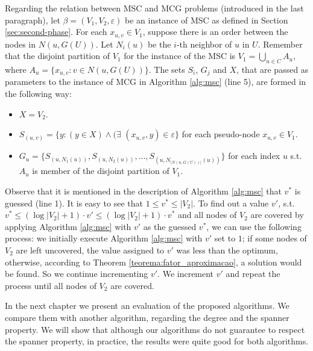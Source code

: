 Regarding the relation between MSC and MCG problems (introduced in the last paragraph), let $\beta=(V_1, V_2, \varepsilon)$ be an instance of MSC as defined in Section \ref{sec:second-phase}. For each $x_{u,v} \in V_1$, 
suppose there is an order between the nodes in $N(u,G(U))$. Let $N_i(u)$ be the $i$-th neighbor of $u$ in $U$. Remember that the disjoint partition 
of $V_1$ for the instance of the MSC is $V_1 = \bigcup_{u \in C}A_u$, where $A_u = \lbrace x_{u,v} :  v \in N(u, G(U)) \rbrace$. 
The sets $S_i$, $G_j$ and $X$, that are passed as parameters to the instance of MCG in Algorithm \ref{alg:msc} (line 5), are formed in the following way:

    \begin{itemize}
      \item $X = V_2$.
      \item $S_{(u, v)}=\{y : (y \in X) \land (\exists$ $(x_{u, v}, y) \in \varepsilon\}$ for each pseudo-node $x_{u, v} \in V_1$.
      \item $G_u = \lbrace S_{(u,N_1(u))}, S_{(u,N_2(u))}, ..., S_{(u,N_{|N(u,G(U))|}(u))} \rbrace$ for each index $u$ s.t. $A_u$ is member of the disjoint partition of $V_1$.
    \end{itemize}

Observe that it is mentioned in the description of Algorithm \ref{alg:msc} that $v^*$ is guessed (line 1). It is easy to see that $1 \leq v^* \leq |V_2|$. 
To find out a value $v'$, s.t. $v^* \leq (\log |V_2| + 1) \cdot v' \leq (\log |V_2| + 1) \cdot v^*$ and all nodes of $V_2$ are covered by applying Algorithm \ref{alg:msc} with $v'$ as the guessed $v^*$, 
we can use the following process: we initially execute Algorithm \ref{alg:msc} with $v'$ set to $1$; if some nodes of $V_2$ are left 
uncovered, the value assigned to $v'$ was less than the optimum, otherwise, according to Theorem \ref{teorema:fator_aproximacao}, a solution would be found. So we continue incrementing $v'$. 
We increment $v'$ and repeat the process until all nodes of $V_2$ are covered.

In the next chapter we present an evaluation of the proposed algorithms. We compare them with another algorithm, regarding 
the degree and the spanner property. We will show that although our algorithms do not guarantee to respect the spanner property, in practice, the results 
were quite good for both algorithms.

